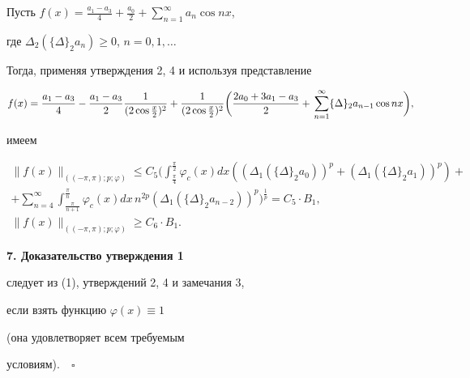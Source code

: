 Пусть $f(x)= \frac{a_1 - a_3}{4} + \frac{a_0}{2} +


\sum\limits_{n=1}^{\infty} a_n \cos nx$,


где $\Delta_2(\{\Delta\}_2 a_n) \geq 0$, $n= 0, 1,\dotsc$


Тогда, применяя утверждения 2, 4 и используя представление


$$


f(x)= \frac{a_1 - a_3}{4} - \frac{a_1 - a_3}{2}


\frac{1}{(2 \cos \frac{x}{2})^2} + \frac{1}{(2 \cos \frac{x}{2})^2}


\bigg(\frac{2a_0+3a_1-a_3}{2} + \\


\sum\limits_{n=1}^{\infty} \{ \Delta \}_2 a_{n-1} \cos {nx}\bigg),


$$


имеем


\begin{gather*}


\| f(x)\| _{((-\pi,\pi);p;\varphi )} \leq


C_5 \bigg( \int_{\frac{\pi}{4}}^{\frac{\pi}{2}} \varphi_c(x)


dx ((\Delta_1(\{\Delta\}_2 a_0))^p +(\Delta_1(\{\Delta\}_2 a_1))^p) +\\


+\sum\limits_{n=4}^{\infty} \int_{\frac{\pi}{n+1}}^{\frac{\pi}{n}}


\varphi_c(x) dx\,n^{2p} (\Delta_1(\{\Delta\}_2 a_{n-2})


)^p\bigg)^{\frac{1}{p}} = C_5\cdot B_1,\\


\| f(x)\|_{((-\pi,\pi);p;\varphi )} \geq C_6 \cdot B_1.


\end{gather*}





{\bf 7. Доказательство утверждения 1 }


следует из (1), утверждений 2, 4 и замечания 3,


если взять функцию $\varphi (x) \equiv 1$ 


(она удовлетворяет всем требуемым


условиям).$\quad\square$








